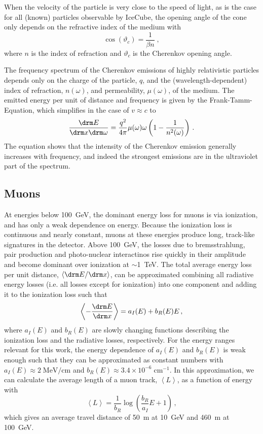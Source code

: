 When the velocity of the particle is very close to the speed of light, as is the case for all (known) particles observable by IceCube, the opening angle of the cone only depends on the refractive index of the medium with
\begin{equation}
    \cos(\vartheta_c)=\frac{1}{\beta n}\;,
\end{equation}
where $n$ is the index of refraction and $\vartheta_c$ is the Cherenkov opening angle.

The frequency spectrum of the Cherenkov emissions of highly relativistic particles depends only on the charge of the particle, $q$, and the (wavelength-dependent) index of refraction, $n(\omega)$, and permeability, $\mu(\omega)$, of the medium.
The emitted energy per unit of distance and frequency is given by the Frank-Tamm-Equation, which simplifies in the case of $v\approx c$ to
\begin{equation}
    \frac{\drm E}{\drm x \drm \omega}=\frac{q^2}{4\pi}\mu(\omega)\omega\left(1-\frac{1}{n^2(\omega)}\right)\,.
\end{equation}
The equation shows that the intensity of the Cherenkov emission generally increases with frequency, and indeed the strongest emissions are in the ultraviolet part of the spectrum.

\subsection{Muons}
\label{sec:muon-propagation}
At energies below 100~GeV, the dominant energy loss for muons is via ionization, and has only a weak dependence on energy.
Because the ionization loss is continuous and nearly constant, muons at these energies produce long, track-like signatures in the detector.
Above 100~GeV, the losses due to bremsstrahlung, pair production and photo-nuclear interactinos rise quickly in their amplitude and become dominant over ionization at $\sim$1~TeV.
The total average energy loss per unit distance, $\left<\drm E/\drm x\right>$, can be approximated combining all radiative energy losses (i.e.
all losses except for ionization) into one component and adding it to the ionization loss such that
\begin{equation}
    \left<-\frac{\drm E}{\drm x}\right> = a_I(E) + b_R(E)E\,,
\end{equation}
where $a_I(E)$ and $b_R(E)$ are slowly changing functions describing the ionization loss and the radiative losses, respectively\cite{muonstoppingpower}. For the energy ranges relevant for this work, the energy dependence of $a_I(E)$ and $b_R(E)$ is weak enough such that they can be approximated as constant numbers with $a_I(E)\approx 2\;\mathrm{MeV/cm}$ and $b_R(E)\approx3.4\times10^{-6}\;\mathrm{cm^{-1}}$\cite{muonstoppingpower}.
In this approximation, we can calculate the average length of a muon track, $\left<L\right>$, as a function of energy with
\begin{equation}
    \left<L\right>=\frac{1}{b_R}\log\left(\frac{b_R}{a_I}E + 1\right)\,,
\end{equation}
which gives an average travel distance of 50~m at 10~GeV and 460~m at 100~GeV.


